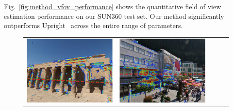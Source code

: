 Fig.~\ref{fig:method_vfov_performance} shows the quantitative field of view estimation performance on our SUN360 test set.
Our method significantly outperforms Upright~\cite{Lee2014} across the entire range of parameters.



\newcommand{\sgbpwidth}{0.2}
\begin{figure}
\centering
\bgroup
\def\arraystretch{0}
\begin{tabular}{@{}c@{}c@{}c@{}c@{}c@{}}
\includegraphics[width=\sgbpwidth\linewidth]{figures/nn_analysis/sgbp/pano_addbhhhqoevobx_jpg-1.png} &
\includegraphics[width=\sgbpwidth\linewidth]{figures/nn_analysis/sgbp/pano_addfjqyibbzulh_jpg-2.png} &

\end{tabular}
\end{figure}
